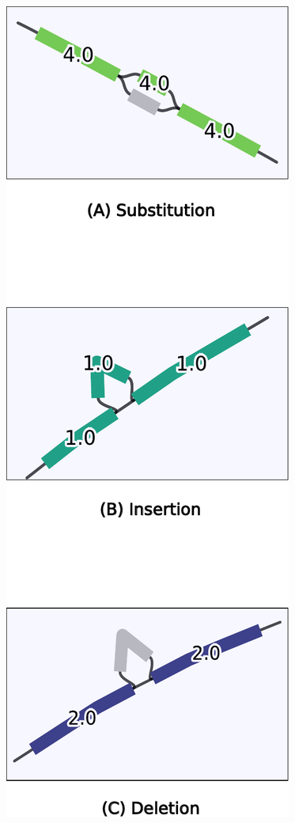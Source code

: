 \documentclass{bioinfo}
\theoremstyle{definition}
\begin{document}
\begin{figure}[htbp]
\begin{minipage}[b]{0.35\columnwidth}
		\includegraphics[width=\textwidth]{panels.pdf}

\end{minipage}
\end{figure}
\end{document}
